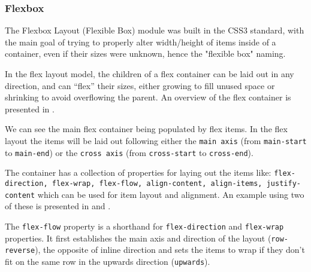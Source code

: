 



\subsubsection{Flexbox}
\label{sub-sub-sec:flexbox}

The Flexbox Layout (Flexible Box) module was built in the CSS3 standard, with the main goal of trying to properly alter width/height of items inside of a container, even if their sizes were unknown, hence the "flexible box" naming.

In the flex layout model, the children of a flex container can be laid out in any direction, and can “flex” their sizes, either growing to fill unused space or shrinking to avoid overflowing the parent\cite{flexbox}. An overview of the flex container is presented in .


We can see the main flex container being populated by flex items. In the flex layout the items will be laid out following either the \texttt{main axis} (from \texttt{main-start} to \texttt{main-end}) or the \texttt{cross axis} (from \texttt{cross-start} to \texttt{cross-end}).

The container has a collection of properties for laying out the items like: \texttt{flex-direction, flex-wrap, flex-flow, align-content, align-items, justify-content} which can be used for item layout and alignment. An example using two of these is presented in  and .




The \texttt{flex-flow} property is a shorthand for \texttt{flex-direction} and \texttt{flex-wrap} properties. It first establishes the main axis and direction of the layout (\texttt{row-reverse}), the opposite of inline direction and sets the items to wrap if they don't fit on the same row in the upwards direction (\texttt{upwards}).